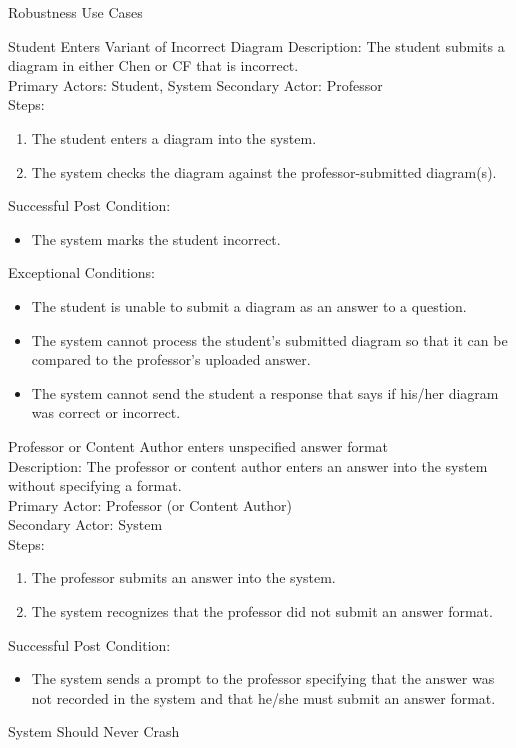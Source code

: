 \documentclass{article}
\begin{document}
\begin{section}{Robustness Use Cases}
    \begin{subsection}{Student Enters Variant of Incorrect Diagram}
    Description: The student submits a diagram in either Chen or CF that is incorrect.\\
    Primary Actors: Student, System
    Secondary Actor: Professor\\
    Steps:	
    \begin{enumerate}
    \item The student enters a diagram into the system.
    \item The system checks the diagram against the professor-submitted diagram(s).
    \end{enumerate}
    Successful Post Condition: 
        \begin{itemize}
            \item The system marks the student incorrect.
        \end{itemize}
    Exceptional Conditions:
        \begin{itemize}
            \item The student is unable to submit a diagram as an answer to a question.
            \item The system cannot process the student’s submitted diagram so that it can be compared to the professor’s uploaded answer.
            \item The system cannot send the student a response that says if his/her diagram was correct or incorrect.
        \end{itemize}
    \end{subsection}
    \begin{subsection}{Professor or Content}
        Author enters unspecified answer format\\
        Description: The professor or content author enters an answer into the system without specifying a format.\\
        Primary Actor: Professor (or Content Author)\\
        Secondary Actor: System\\
        Steps:	
        \begin{enumerate}
            \item The professor submits an answer into the system.	
            \item The system recognizes that the professor did not submit an answer format.
        \end{enumerate}
            Successful Post Condition: 
                \begin{itemize}
                    \item The system sends a prompt to the professor specifying that the answer was not recorded in the system and that he/she must submit an answer format.
                \end{itemize}
    \end{subsection}
    \begin{subsection}{System Should Never Crash}
    

\end{subsection}
\end{section}
\end{document}
